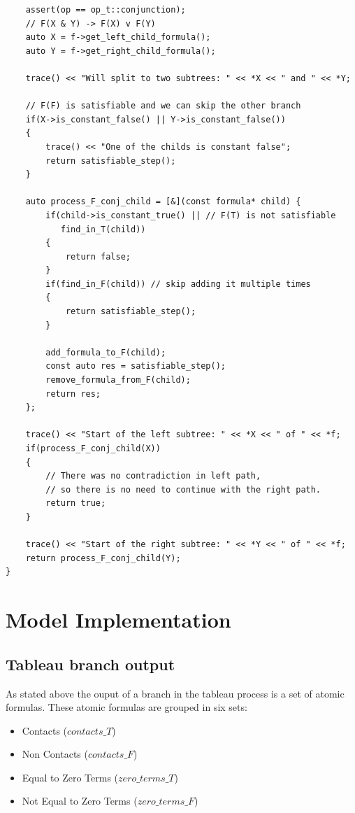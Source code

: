 \documentclass{article}
\begin{document}
\begin{lstlisting}
    assert(op == op_t::conjunction);
    // F(X & Y) -> F(X) v F(Y)
    auto X = f->get_left_child_formula();
    auto Y = f->get_right_child_formula();

    trace() << "Will split to two subtrees: " << *X << " and " << *Y;

    // F(F) is satisfiable and we can skip the other branch
    if(X->is_constant_false() || Y->is_constant_false())
    {
        trace() << "One of the childs is constant false";
        return satisfiable_step();
    }

    auto process_F_conj_child = [&](const formula* child) {
        if(child->is_constant_true() || // F(T) is not satisfiable
           find_in_T(child))
        {
            return false;
        }
        if(find_in_F(child)) // skip adding it multiple times
        {
            return satisfiable_step();
        }

        add_formula_to_F(child);
        const auto res = satisfiable_step();
        remove_formula_from_F(child);
        return res;
    };

    trace() << "Start of the left subtree: " << *X << " of " << *f;
    if(process_F_conj_child(X))
    {
        // There was no contradiction in left path,
        // so there is no need to continue with the right path.
        return true;
    }

    trace() << "Start of the right subtree: " << *Y << " of " << *f;
    return process_F_conj_child(Y);
}
\end{lstlisting}

	\newpage
	\section{Model Implementation}

	\subsection*{Tableau branch output}
	\label{tableau:branch:output}
	As stated above the ouput of a branch in the tableau process is a set of atomic formulas. These atomic formulas are grouped in six sets:
	\begin{itemize}
		\item Contacts ($contacts\_T$)
		\item Non Contacts ($contacts\_F$)
		\item Equal to Zero Terms ($zero\_terms\_T$)
		\item Not Equal to Zero Terms ($zero\_terms\_F$)
	\end{itemize}
\end{document}
